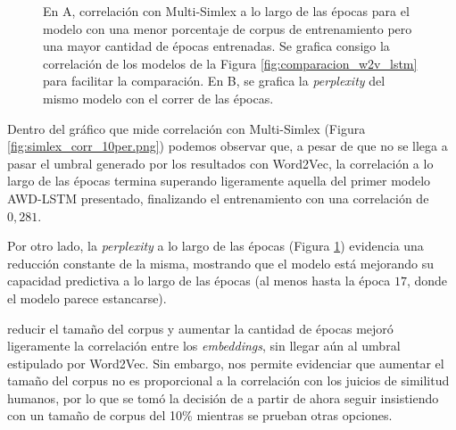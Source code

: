 \begin{figure}[htb]
\begin{subfigure}[b]{.45\textwidth}
        \caption{}
        \label{fig:perp_10per.png}
    \end{subfigure}
    \caption{En A, correlación con Multi-Simlex a lo largo de las épocas para el modelo con 
    una menor porcentaje de corpus de entrenamiento pero una mayor cantidad de épocas 
    entrenadas. Se grafica consigo la correlación de los modelos de la Figura \ref{fig:comparacion_w2v_lstm} para 
    facilitar la comparación. En B, se grafica la \textit{perplexity} del mismo modelo con el correr 
    de las épocas.}
    \label{fig:10per}
\end{figure}

Dentro del gráfico que mide correlación con Multi-Simlex (Figura \ref{fig:simlex_corr_10per.png}) podemos observar que, 
a pesar de que no se llega a pasar el umbral generado por los resultados con Word2Vec, la 
correlación a lo largo de las épocas termina superando ligeramente aquella del primer 
modelo AWD-LSTM presentado, finalizando el entrenamiento con una correlación de $0,281$.

Por otro lado, la \textit{perplexity} a lo largo de las épocas (Figura \ref{fig:perp_10per.png}) 
evidencia una reducción constante de la misma, mostrando que el modelo está mejorando su 
capacidad predictiva a lo largo de las épocas (al menos hasta la época $17$, donde el 
modelo parece estancarse).


 reducir el tamaño del corpus y aumentar la cantidad de épocas mejoró ligeramente la 
correlación entre los \textit{embeddings}, sin llegar aún al umbral estipulado por Word2Vec. 
Sin embargo, nos permite evidenciar que aumentar el tamaño del corpus no es 
proporcional a la correlación con los juicios de similitud humanos, por lo que 
se tomó la decisión de a partir de ahora seguir insistiendo con un tamaño de 
corpus del 10\% mientras se prueban otras opciones.

\subsubsection{}

